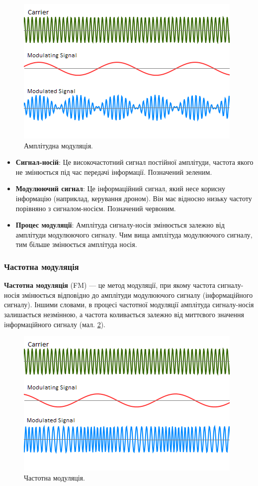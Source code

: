 \documentclass{article}
\begin{document}
\begin{figure}[h!]
\centering
\includegraphics[width=0.6\linewidth]{images/am.png}
\caption{\label{fig:am}Амплітудна модуляція.}
\end{figure}

\begin{itemize}[noitemsep, topsep=8pt]
\item \textbf{Сигнал-носій}: Це високочастотний сигнал постійної амплітуди, частота якого не змінюється під час передачі інформації. Позначений зеленим.
\item \textbf{Модулюючий сигнал}: Це інформаційний сигнал, який несе корисну інформацію (наприклад, керування дроном). Він має відносно низьку частоту порівняно з сигналом-носієм. Позначений червоним.
\item \textbf{Процес модуляції}: Амплітуда сигналу-носія змінюється залежно від амплітуди модулюючого сигналу. Чим вища амплітуда модулюючого сигналу, тим більше змінюється амплітуда носія.
\end{itemize}

\subsubsection{Частотна модуляція}

\textbf{Частотна модуляція} (FM) --- це метод модуляції, при якому частота сигналу-носія змінюється відповідно до амплітуди модулюючого сигналу (інформаційного сигналу). Іншими словами, в процесі частотної модуляції амплітуда сигналу-носія залишається незмінною, а частота коливається залежно від миттєвого значення інформаційного сигналу (мал. \ref{fig:fm}).

\begin{figure}[h!]
\centering
\includegraphics[width=0.6\linewidth]{images/fm.png}
\caption{\label{fig:fm}Частотна модуляція.}
\end{figure}
\end{document}
